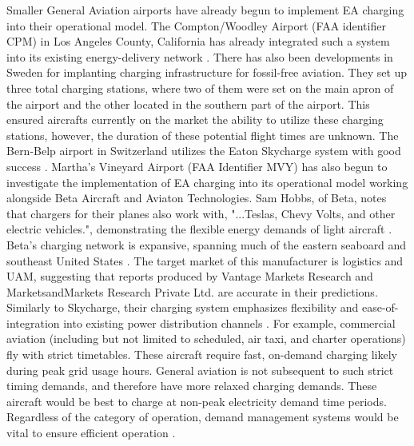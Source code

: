 \documentclass[../main.tex]{subfiles}
\begin{document}
Smaller General Aviation airports have already begun to implement EA charging into their operational model. The Compton/Woodley Airport (FAA identifier CPM) in Los Angeles County, California has already integrated such a system into its existing energy-delivery network \cite{ref28}. There has also been developments in Sweden for implanting charging infrastructure for fossil-free aviation. They set up three total charging stations, where two of them were set on the main apron of the airport and the other located in the southern part of the airport. This ensured aircrafts currently on the market the ability to utilize these charging stations, however, the duration of these potential flight times are unknown. The Bern-Belp airport in Switzerland utilizes the Eaton Skycharge system with good success \cite{ref3}. Martha's Vineyard Airport (FAA Identifier MVY) has also begun to investigate the implementation of EA charging into its operational model working alongside Beta Aircraft and Aviaton Technologies. Sam Hobbs, of Beta, notes that chargers for their planes also work with, "...Teslas, Chevy Volts, and other electric vehicles.", demonstrating the flexible energy demands of light aircraft \cite{ref29}. Beta's charging network is expansive, spanning much of the eastern seaboard and southeast United States \cite{ref30}. The target market of this manufacturer is logistics and UAM, suggesting that reports produced by Vantage Markets Research \cite{ref24} and MarketsandMarkets Research Private Ltd. \cite{ref26} are accurate in their predictions. Similarly to Skycharge, their charging system emphasizes flexibility and ease-of-integration into existing power distribution channels \cite{ref30}. For example, commercial aviation (including but not limited to scheduled, air taxi, and charter operations) fly with strict timetables. These aircraft require fast, on-demand charging likely during peak grid usage hours. General aviation is not subsequent to such strict timing demands, and therefore have more relaxed charging demands. These aircraft would be best to charge at non-peak electricity demand time periods. Regardless of the category of operation, demand management systems would be vital to ensure efficient operation \cite{ref40}.\par
\end{document}
